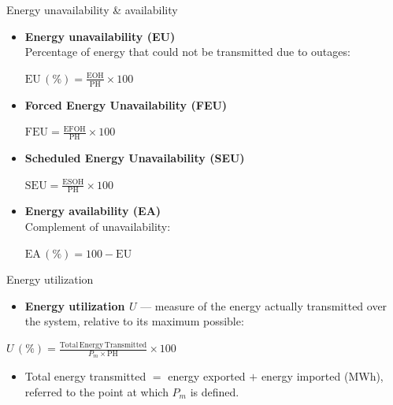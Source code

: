 \begin{frame}{Energy unavailability \& availability}
  \begin{itemize}
    \setlength{\itemsep}{0.4em}
    \item \textbf{Energy unavailability (EU)}\\Percentage of energy that could not be transmitted due to outages:
    \vspace{0.3em}

    {\centering\large $\displaystyle \mathrm{EU}\,(\%) = \frac{\mathrm{EOH}}{\mathrm{PH}}\times 100$ \par}
    \vspace{0.3em}

    \item \textbf{Forced Energy Unavailability (FEU)}
    \vspace{0.3em}

      {\centering\large $\displaystyle \mathrm{FEU}=\frac{\mathrm{EFOH}}{\mathrm{PH}}\times 100$ \par}

    \item \textbf{Scheduled Energy Unavailability (SEU)}
    \vspace{0.3em}

    {\centering\large $\displaystyle \mathrm{SEU}=\frac{\mathrm{ESOH}}{\mathrm{PH}}\times 100$ \par}

    \item \textbf{Energy availability (EA)}\\Complement of unavailability:
    \vspace{0.2em}

    {\centering\large $\displaystyle \mathrm{EA}\,(\%) = 100 - \mathrm{EU}$ \par}
  \end{itemize}
\end{frame}

\begin{frame}{Energy utilization}
  \begin{itemize}
    \item \textbf{Energy utilization $U$} — measure of the energy actually
          transmitted over the system, relative to its maximum possible:
  \end{itemize}
  \vspace{0.5em}
  {\centering\large
    $\displaystyle U\,(\%) = \frac{\mathrm{Total\,Energy\,Transmitted}}{P_m \times \mathrm{PH}}\times 100$ \par}
  \vspace{0.6em}
  \begin{itemize}
    \setlength{\itemsep}{0.3em}
    \item Total energy transmitted $=$ energy exported $+$ energy imported
          (MWh), referred to the point at which $P_m$ is defined.
  \end{itemize}
\end{frame}


